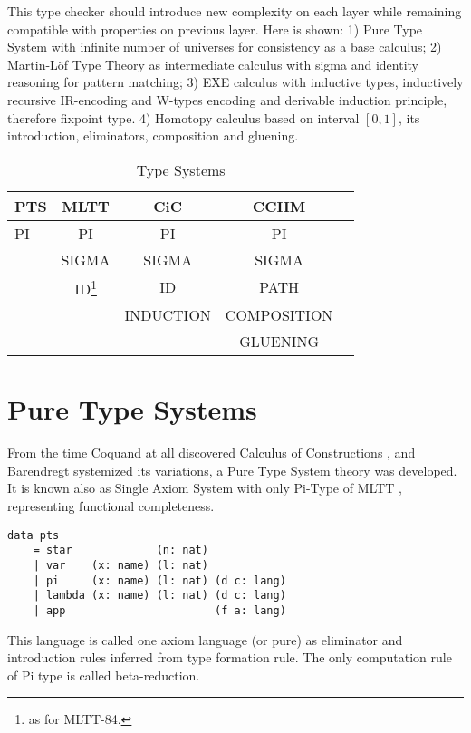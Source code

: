 \documentclass{article}
\newcommand*{\thead}[1]{\multicolumn{1}{c}{\bfseries #1}}
\begin{document}
This type checker should introduce new complexity on each layer while
remaining compatible with properties on previous layer. Here is shown:
1) Pure Type System with infinite number of universes for consistency as a base calculus;
2) Martin-Löf Type Theory as intermediate calculus with sigma and identity reasoning for pattern matching;
3) EXE calculus with inductive types, inductively recursive IR-encoding and W-types encoding and derivable induction principle, therefore fixpoint type.
4) Homotopy calculus based on interval $[0,1]$, its introduction, eliminators, composition and gluening.

\begin{table}[h]
\centering
\caption{Type Systems}
\label{tab:a}
\begin{tabular}{lcccc}
\hline
\thead{PTS} & \thead{MLTT} & \thead{CiC} & \thead{CCHM}\\
\hline
PI        & PI    & PI    & PI \\
          & SIGMA & SIGMA & SIGMA \\
          & ID\footnote{as for MLTT-84.}   & ID    & PATH \\
          &       & INDUCTION   & COMPOSITION \\
          &       &       & GLUENING \\
\hline
\end{tabular}
\end{table}

\section{Pure Type Systems}

From the time Coquand at all discovered Calculus of Constructions \cite{Coq88},
and Barendregt \cite{Henk93} systemized its variations, a Pure Type System
theory was developed. It is known also as Single Axiom System
with only Pi-Type of MLTT \cite{Lof84}, representing functional completeness.

\begin{lstlisting}[mathescape=true]
data pts
    = star             (n: nat)
    | var    (x: name) (l: nat)
    | pi     (x: name) (l: nat) (d c: lang)
    | lambda (x: name) (l: nat) (d c: lang)
    | app                       (f a: lang)
\end{lstlisting}

This language is called one axiom language (or pure) as eliminator
and introduction rules inferred from type formation rule.
The only computation rule of Pi type is called beta-reduction.
\end{document}
